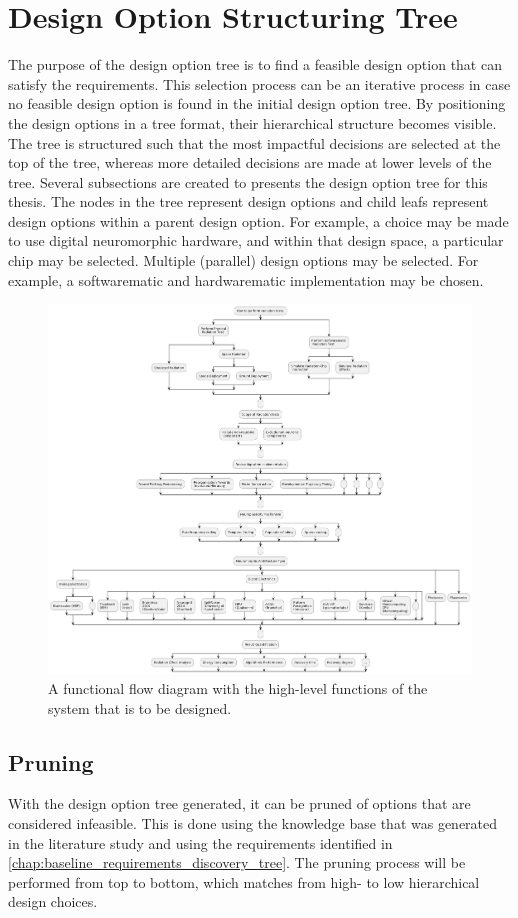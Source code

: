 \chapter{Design Option Structuring Tree}\label{chap:baseline_dot}
The purpose of the design option tree is to find a feasible design option that can satisfy the requirements. This selection process can be an iterative process in case no feasible design option is found in the initial design option tree. By positioning the design options in a tree format, their hierarchical structure becomes visible. The tree is structured such that the most impactful decisions are selected at the top of the tree, whereas more detailed decisions are made at lower levels of the tree. Several subsections are created to   presents the design option tree for this thesis. The nodes in the tree represent design options and child leafs represent design options within a parent design option. For example, a choice may be made to use digital neuromorphic hardware, and within that design space, a particular chip may be selected. Multiple (parallel) design options may be selected. For example, a softwarematic and hardwarematic implementation may be chosen.
\begin{figure}[H]
    \centering
    \includegraphics[width=0.6\linewidth]{latex/Images/Diagrams/dot.png}
    \caption{A functional flow diagram with the high-level functions of the system that is to be designed.}
    \label{fig:baseline_dot}
\end{figure}

\section{Pruning}\label{sec:baseline_pruning}
With the design option tree generated, it can be pruned of options that are considered infeasible. This is done using the knowledge base that was generated in the literature study and using the requirements identified in \cref{chap:baseline_requirements_discovery_tree}.  The pruning process will be performed from top to bottom, which matches from high- to low hierarchical design choices.
